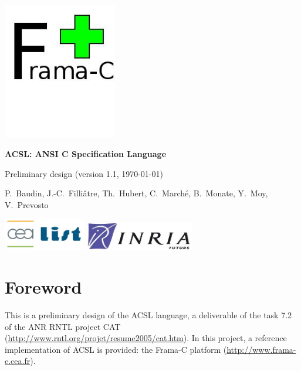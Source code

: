 \documentclass[a4paper,11pt,twoside,openright]{report}
\begin{document}
\sloppy

\begin{titlepage}
\begin{center}
~\vfill

\includegraphics[height=60mm]{FramaC.jpg}

\vspace{20mm}

{\Huge\bfseries ACSL: ANSI C Specification Language}

\bigskip

{\LARGE Preliminary design (version 1.1, \today)}

\vspace{20mm}

{P.~Baudin, J.-C.~Filli\^atre, Th.~Hubert,
  C.~March\'e, B.~Monate, Y.~Moy, V.~Prevosto}

\vspace{20mm}

\vfill

\includegraphics[height=14mm]{cealistlogo.jpg}
\hfill
\includegraphics[height=12mm]{inriafuturslogoshort.jpg}

\end{center}
\end{titlepage}

\clearpage
\label{chap:contents}
\tableofcontents

\chapter*{Foreword}

This is a preliminary design of the ACSL language, a deliverable of
the task 7.2 of the ANR RNTL project CAT
(\url{http://www.rntl.org/projet/resume2005/cat.htm}). In this
project, a reference implementation of ACSL is provided: the Frama-C
platform (\url{http://www.frama-c.cea.fr}).
\end{document}
